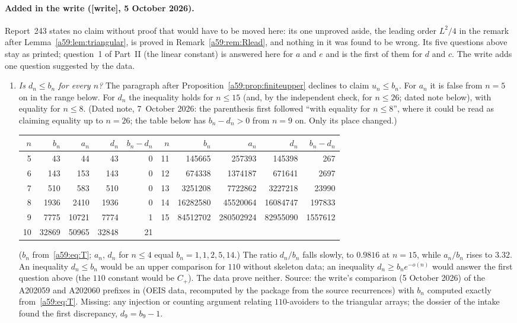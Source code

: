 \documentclass[11pt,letterpaper]{article}
\theoremstyle{remark}\newtheorem{remark}[theorem]{Remark}
\newcommand{\wtag}{\textup{[write]}}
\theoremstyle{remark}\newtheorem{wremark}{Remark}\renewcommand{\thewremark}{W\arabic{wremark}}
\theoremstyle{plain}\newtheorem{wcorollary}[wremark]{Corollary}
\begin{document}
\paragraph{Added in the write (\wtag, 5 October 2026).}
Report~243 states no claim without proof that would have to be moved here:
its one unproved aside, the leading order $L^2/4$ in the remark after
Lemma~\ref{a59:lem:triangular}, is proved in Remark~\ref{a59:rem:Rlead}, and
nothing in it was found to be wrong. Its five questions above stay as
printed; question~1 of Part~II (the linear constant) is answered here for
$a$ and $e$ and is the first of them for $d$ and $c$. The write adds one
question suggested by the data.
\begin{enumerate}[label=(\roman*)]
\item \emph{Is $d_n\le b_n$ for every $n$?} The paragraph after
Proposition~\ref{a59:prop:finiteupper} declines to claim $u_n\le b_n$. For
$a_n$ it is false from $n=5$ on in the range below. For $d_n$ the
inequality holds for $n\le15$ (and, by the independent check, for $n\le26$;
dated note below), with equality for $n\le8$. (Dated note, 7~October 2026:
the parenthesis first followed ``with equality for $n\le8$'', where it could
be read as claiming equality up to $n=26$; the table below has
$b_n-d_n>0$ from $n=9$ on. Only its place changed.)
\begin{center}
\small
\begin{tabular}{@{}rrrrr@{\qquad}rrrrr@{}}
\toprule
$n$ & $b_n$ & $a_n$ & $d_n$ & $b_n-d_n$ & $n$ & $b_n$ & $a_n$ & $d_n$ & $b_n-d_n$\\
\midrule
5 & 43 & 44 & 43 & 0 & 11 & 145665 & 257393 & 145398 & 267\\
6 & 143 & 153 & 143 & 0 & 12 & 674338 & 1374187 & 671641 & 2697\\
7 & 510 & 583 & 510 & 0 & 13 & 3251208 & 7722862 & 3227218 & 23990\\
8 & 1936 & 2410 & 1936 & 0 & 14 & 16282580 & 45520064 & 16084747 & 197833\\
9 & 7775 & 10721 & 7774 & 1 & 15 & 84512702 & 280502924 & 82955090 & 1557612\\
10 & 32869 & 50965 & 32848 & 21 & & & & &\\
\bottomrule
\end{tabular}
\end{center}
($b_n$ from~\eqref{a59:eq:T}; $a_n$, $d_n$ for $n\le4$ equal $b_n=1,1,2,5,14$.)
The ratio $d_n/b_n$ falls slowly, to $0.9816$ at $n=15$, while $a_n/b_n$
rises to $3.32$. An inequality $d_n\le b_n$ would be an upper comparison
for $110$ without skeleton data; an inequality $d_n\ge b_ne^{-o(n)}$ would
answer the first question above (the $110$ constant would be $C_+$). The
data prove neither. Source: the write's comparison (5 October 2026) of the
A202059 and A202060 prefixes in 
(OEIS data, recomputed by the package from the source recurrences) with
$b_n$ computed exactly from~\eqref{a59:eq:T}. Missing: any injection or
counting argument relating $110$-avoiders to the triangular arrays; the
dossier of the intake found the first discrepancy, $d_9=b_9-1$.


\end{enumerate}
\end{document}
